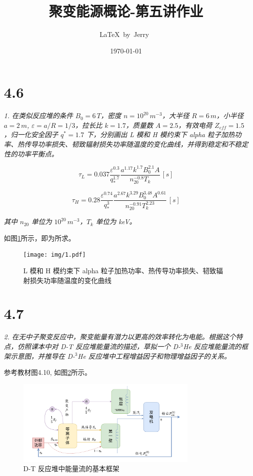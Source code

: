 \documentclass{article}
\title{聚变能源概论-第五讲作业}
\author{\LaTeX\ by\ Jerry\ }
\date{\today}
\begin{document}
\pagestyle{fancy}

\fancyhead[R]{\today}

\section*{4.6}

\emph{1. 在类似反应堆的条件 $ B_0 = 6 \, T $，密度 $ n = 10^{20} \, m^{-3} $，大半径 $ R = 6 \, m $，小半径 $ a = 2 \, m $, $ \varepsilon = a / R = 1/3 $，拉长比 $ k = 1.7 $，质量数 $ A = 2.5 $，有效电荷 $ Z_{eff} = 1.5 $，归一化安全因子 $ q^* = 1.7 $ 下，分别画出 L 模和 H 模约束下 alpha 粒子加热功率、热传导功率损失、韧致辐射损失功率随温度的变化曲线，并得到稳定和不稳定性的功率平衡点。}

$$\tau_L = 0.037 \frac{\varepsilon^{0.3}}{q_*^{1.7}} \frac{a^{1.17} k^{1.7} B_0^{2.1} A}{n_{20}^{-0.8} T_k} \, [s]$$

$$\tau_H = 0.28 \frac{\varepsilon^{0.74}}{q_*^3} \frac{a^{2.67} k^{3.29} B_0^{3.48} A^{0.61}}{n_{20}^{-0.91} T_k^{2.23}} \, [s]$$

\emph{其中 $ n_{20} $ 单位为 $ 10^{20} \, m^{-3} $，$ T_k $ 单位为 keV。}

如图\ref{fig:1}所示，即为所求。

\begin{figure}[htbp]
    \centering
    \texttt{[image: img/1.pdf]}
    \caption{L 模和 H 模约束下 alpha 粒子加热功率、热传导功率损失、韧致辐射损失功率随温度的变化曲线}
    \label{fig:1}
\end{figure}

\section*{4.7}

\emph{2. 在无中子聚变反应中，聚变能量有潜力以更高的效率转化为电能。根据这个特点，仿照课本中对 D-T 反应堆能量流的描述，草拟一个 D-${}^{3}$He 反应堆能量流的框架示意图，并推导在 D-${}^{3}$He 反应堆中工程增益因子和物理增益因子的关系。}

参考教材图4.10, 如图\ref{fig:frame}所示。

\begin{figure}[htbp]
    \centering
    \includegraphics[width=0.8\textwidth]{img/frame.png}
    \caption{D-T 反应堆中能量流的基本框架}
    \label{fig:frame}
\end{figure}
\end{document}
